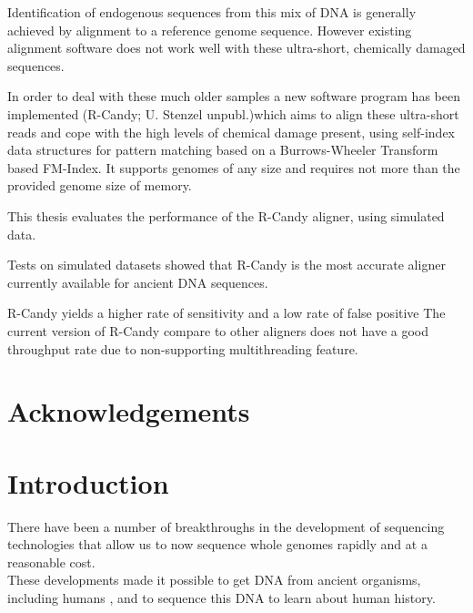 \documentclass[11pt,a4paper]{report}
\begin{document}
Identification of endogenous sequences from this mix of DNA is generally achieved by alignment to a reference genome sequence. 
However existing alignment software does not work well with these ultra-short, chemically damaged sequences.

In order to deal with these much older samples a new software program has been implemented
(R-Candy; U. Stenzel unpubl.)which aims to align these ultra-short reads and cope with the high 
levels of chemical damage present, using self-index data structures for pattern matching
based on a Burrows-Wheeler Transform based FM-Index.
It supports genomes of any size and requires not more than the provided genome size of memory.

This thesis evaluates the performance of the R-Candy aligner, using simulated data.

Tests on simulated datasets showed that R-Candy is the most accurate aligner currently available for ancient DNA sequences.

R-Candy yields a higher rate of sensitivity 
and a low rate of false positive
The current version of R-Candy compare to other aligners does not have a good throughput rate due to non-supporting multithreading feature. 

\newpage\null\thispagestyle{empty}\newpage
\section*{Acknowledgements}
\newpage\null\thispagestyle{empty}\newpage

\tableofcontents
\newpage
\listoftables
\newpage
\listoffigures
\newpage




\section{Introduction} \label{Introduction}


There have been a number of breakthroughs in the development of sequencing 
technologies that allow us to now sequence whole genomes rapidly and at a 
reasonable cost\cite{NGS}\cite{454}\cite{NGS2}.
\\
These developments made it possible to get DNA from ancient organisms, 
including humans \cite{AncientDNA}\cite{fish2human}, and to sequence 
this DNA to learn about human history\cite{impactOFhg}\cite{ourGenome}\cite{SNP}.
\end{document}
